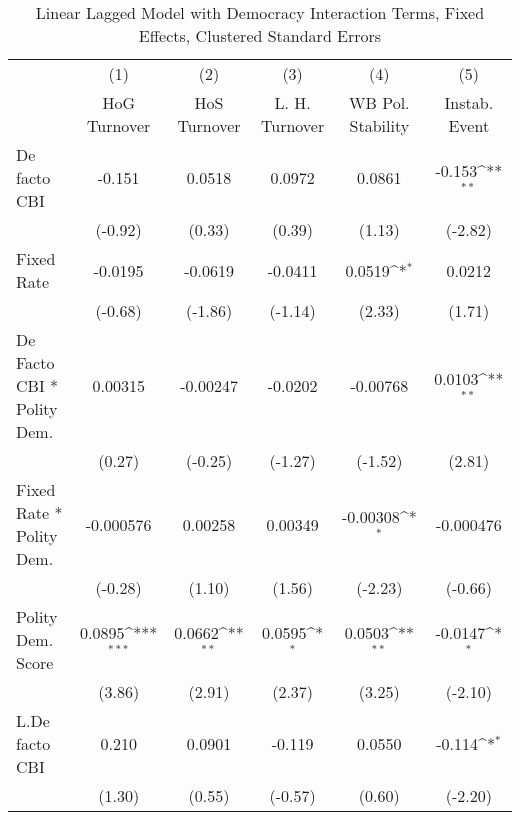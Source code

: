{
\def\sym#1{\ifmmode^{#1}\else\(^{#1}\)\fi}
\begin{longtable}{l*{5}{c}}
\caption{Linear Lagged Model with Democracy Interaction Terms, Fixed Effects, Clustered Standard Errors \label{demintlagsDF}}\\
\hline\hline\endfirsthead\hline\endhead\hline\endfoot\endlastfoot
                &\multicolumn{1}{c}{(1)}&\multicolumn{1}{c}{(2)}&\multicolumn{1}{c}{(3)}&\multicolumn{1}{c}{(4)}&\multicolumn{1}{c}{(5)}\\
                &\multicolumn{1}{c}{HoG Turnover}&\multicolumn{1}{c}{HoS Turnover}&\multicolumn{1}{c}{L. H. Turnover}&\multicolumn{1}{c}{WB Pol. Stability}&\multicolumn{1}{c}{Instab. Event}\\
\hline
De facto CBI    &   -0.151         &   0.0518         &   0.0972         &   0.0861         &   -0.153\sym{**} \\
                &  (-0.92)         &   (0.33)         &   (0.39)         &   (1.13)         &  (-2.82)         \\
[1em]
Fixed Rate      &  -0.0195         &  -0.0619         &  -0.0411         &   0.0519\sym{*}  &   0.0212         \\
                &  (-0.68)         &  (-1.86)         &  (-1.14)         &   (2.33)         &   (1.71)         \\
[1em]
De Facto CBI * Polity Dem.&  0.00315         & -0.00247         &  -0.0202         & -0.00768         &   0.0103\sym{**} \\
                &   (0.27)         &  (-0.25)         &  (-1.27)         &  (-1.52)         &   (2.81)         \\
[1em]
Fixed Rate * Polity Dem.&-0.000576         &  0.00258         &  0.00349         & -0.00308\sym{*}  &-0.000476         \\
                &  (-0.28)         &   (1.10)         &   (1.56)         &  (-2.23)         &  (-0.66)         \\
[1em]
Polity Dem. Score&   0.0895\sym{***}&   0.0662\sym{**} &   0.0595\sym{*}  &   0.0503\sym{**} &  -0.0147\sym{*}  \\
                &   (3.86)         &   (2.91)         &   (2.37)         &   (3.25)         &  (-2.10)         \\
[1em]
L.De facto CBI  &    0.210         &   0.0901         &   -0.119         &   0.0550         &   -0.114\sym{*}  \\
                &   (1.30)         &   (0.55)         &  (-0.57)         &   (0.60)         &  (-2.20)         \\

\end{longtable}}
